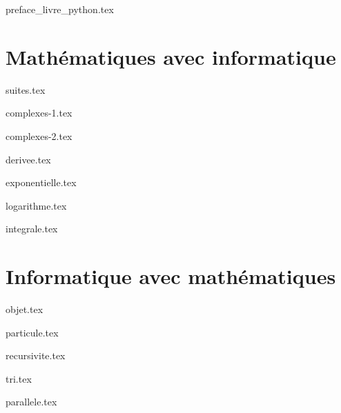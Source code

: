 \documentclass[11pt]{report}
\begin{document}
\renewcommand{\contentsname}{Sommaire}

{preface_livre_python.tex}
\debutchapitres
{}


\clearemptydoublepage



\part{Mathématiques avec informatique}

{suites.tex}

{complexes-1.tex}

{complexes-2.tex}

{derivee.tex}

{exponentielle.tex}

{logarithme.tex}

{integrale.tex}




\part{Informatique avec mathématiques}

{objet.tex}

{particule.tex}

{recursivite.tex}

{tri.tex}

{parallele.tex}


\end{document}

